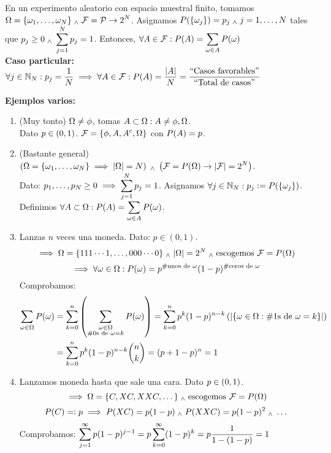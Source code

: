 \begin{ejem}
	En un experimento aleatorio con espacio muestral finito, tomamos \\
	$\displaystyle \Omega = \{\omega_1, \dots, \omega_N\}  \; _{\wedge} \; \mathcal{F} = \mathcal{P} \rightarrow 2^N$. Asignamos $\displaystyle P(\{\omega_j\}) = p_j \; _{\wedge} \; j = 1, \dots, N$ tales que $\displaystyle p_j\geq 0 \; _{\wedge} \; \sum_{j=1}^{N} p_j = 1$. Entonces, $\displaystyle\forall A \in \mathcal{F} : P(A) = \sum_{\omega \in A} P(\omega)$ \\
	\textbf{Caso particular: }$\displaystyle \forall j \in \mathbb{N}_N : p_j = \frac{1}{N} \implies \forall A \in \mathcal{F} : P(A) = \frac{|A|}{N} = \frac{\text{``Casos favorables''}}{\text{``Total de casos''}}$
\end{ejem}
\textbf{Ejemplos varios:}
\begin{enumerate}%
	\item (Muy tonto) $\displaystyle\Omega \ne \phi$, tomas $\displaystyle A \subset \Omega : A\ne \phi, \Omega$. \\
	      Dato $\displaystyle p\in (0, 1)$. $\displaystyle\mathcal{F} = \{\phi, A, A^c, \Omega\}$ con $\displaystyle P(A) = p$.
	\item (Bastante general) $\displaystyle\left(\Omega = \{\omega_1, \dots, \omega_N\} \implies |\Omega| = N\right) \; _{\wedge} \; \left(\mathcal{F} = P(\Omega) \rightarrow |\mathcal{F}|=2^N\right)$. \\
	      Dato: $\displaystyle p_1, \dots, p_N \ge 0 \implies \sum_{j=1}^N p_j=1$.
	      Asignamos $\displaystyle \forall j\in \mathbb{N}_N : p_j\vcentcolon= P(\{\omega_j\})$.\\
	      Definimos $\displaystyle \forall A\subset \Omega : P(A) = \sum_{\omega \in A}P(\omega)$.\\
	\item Lanzas $n$ veces una moneda. Dato: $p \in (0,1)$.
	      \[\implies \Omega = \{111\cdots1, \dots, 000\cdots0\} \; _{\wedge} \; |\Omega|=2^N \; _{\wedge} \; \text{escogemos } \mathcal{F}=P(\Omega)\]
	      \[\implies \forall \omega \in \Omega : P(\omega)= p^{\#\text{unos de }\omega} (1-p)^{\#\text{ceros de }\omega}\]
	      Comprobamos:
	      \begin{equation*}
		      \begin{split}
			      \displaystyle\sum_{\omega \in \Omega} P(\omega) & =\sum_{k=0}^n \left(\sum_{\substack{\omega\in \Omega                                         \\
			      \#\text{0s de }\omega = k}} P(\omega)\right)=\sum_{k=0}^n p^k (1-p)^{n-k}\left(|\{\omega\in \Omega :\#\text{1s de } \omega=k\}|\right) \\
			                                            & =\sum_{k=0}^np^k(1-p)^{n-k} \binom{n}{k} = (p+1-p)^n=1
		      \end{split}
	      \end{equation*}
	\item Lanzamos moneda hasta que sale una cara. Dato $\displaystyle p\in (0,1)$.
	      \[\implies \Omega = \{C, XC, XXC, \dots\} \; _{\wedge} \; \text{escogemos } \mathcal{F}=P(\Omega)\]
	      \[P(C)=\vcentcolon p \implies P(XC)=p(1-p) \; _{\wedge} \; P(XXC)=p(1-p)^2 \; _{\wedge} \; \dots\]
	      Comprobamos: $\displaystyle\sum_{j=1}^{\infty} p(1-p)^{j-1} = p\sum_{k=0}^\infty(1-p)^k =
		      p \frac{1}{1-(1-p)} = 1$
\end{enumerate}

